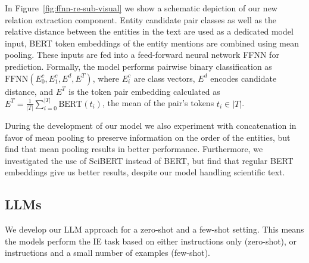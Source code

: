 In Figure~\ref{fig:ffnn-re-sub-visual} we show a schematic depiction of our new relation extraction component. Entity candidate pair classes as well as the relative distance between the entities in the text are used as a dedicated model input, BERT token embeddings of the entity mentions are combined using mean pooling. These inputs are fed into a feed-forward neural network FFNN for prediction. Formally, the model performs pairwise binary classification as $\text{FFNN}(E^c_0, E^c_1, E^d, E^T)$, where $E^c_i$ are class vectors, $E^d$ encodes candidate distance, and $E^T$ is the token pair embedding calculated as $E^T=\frac{1}{|T|}\sum^{|T|}_{i=0}\text{BERT}(t_i)$, the mean of the pair's tokens $t_i\in|T|$.


During the development of our model we also experiment with concatenation in favor of mean pooling to preserve information on the order of the entities, but find that mean pooling results in better performance. Furthermore, we investigated the use of SciBERT instead of BERT, but find that regular BERT embeddings give us better results, despite our model handling scientific text.


\subsection{LLMs}\label{sec:methLLMs}

We develop our LLM approach for a zero-shot and a few-shot setting. This means the models perform the IE task based on either instructions only (zero-shot), or instructions and a small number of examples (few-shot).




